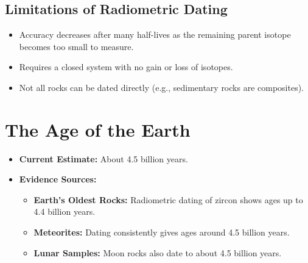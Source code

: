 \documentclass[12pt]{article}
\begin{document}
\subsection*{Limitations of Radiometric Dating}
\begin{itemize}
    \item Accuracy decreases after many half-lives as the remaining parent isotope becomes too small to measure.
    \item Requires a closed system with no gain or loss of isotopes.
    \item Not all rocks can be dated directly (e.g., sedimentary rocks are composites).
\end{itemize}

\section*{The Age of the Earth}
\begin{itemize}
    \item \textbf{Current Estimate:} About 4.5 billion years.
    \item \textbf{Evidence Sources:}
    \begin{itemize}
        \item \textbf{Earth's Oldest Rocks:} Radiometric dating of zircon shows ages up to 4.4 billion years.
        \item \textbf{Meteorites:} Dating consistently gives ages around 4.5 billion years.
        \item \textbf{Lunar Samples:} Moon rocks also date to about 4.5 billion years.
    \end{itemize}
\end{itemize}
\end{document}
